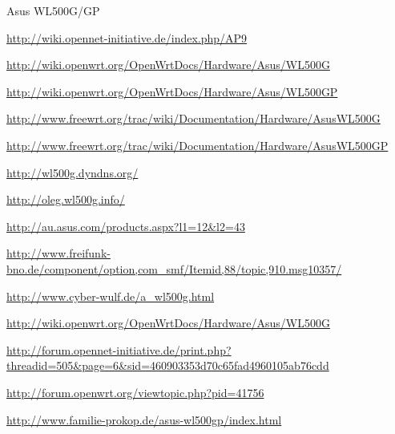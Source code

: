 \begin{wlandevice}{Asus WL500G/GP}
\begin{wlanlink}
\item \url{http://wiki.opennet-initiative.de/index.php/AP9}
\item \url{http://wiki.openwrt.org/OpenWrtDocs/Hardware/Asus/WL500G}
\item \url{http://wiki.openwrt.org/OpenWrtDocs/Hardware/Asus/WL500GP}
\item \url{http://www.freewrt.org/trac/wiki/Documentation/Hardware/AsusWL500G}
\item \url{http://www.freewrt.org/trac/wiki/Documentation/Hardware/AsusWL500GP}
\item \url{http://wl500g.dyndns.org/}
\item \url{http://oleg.wl500g.info/}
\item \url{http://au.asus.com/products.aspx?l1=12&l2=43}
\item \url{http://www.freifunk-bno.de/component/option,com_smf/Itemid,88/topic,910.msg10357/}
\item \url{http://www.cyber-wulf.de/a_wl500g.html}
\item \url{http://wiki.openwrt.org/OpenWrtDocs/Hardware/Asus/WL500G}
\item \url{http://forum.opennet-initiative.de/print.php?threadid=505&page=6&sid=460903353d70c65fad4960105ab76cdd}
\item \url{http://forum.openwrt.org/viewtopic.php?pid=41756}
\item \url{http://www.familie-prokop.de/asus-wl500gp/index.html}
\end{wlanlink}

\end{wlandevice}
